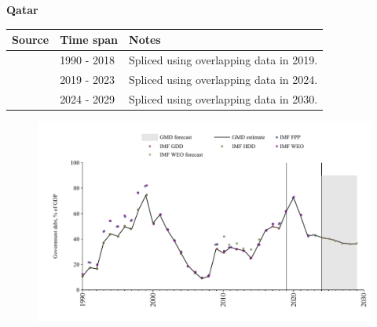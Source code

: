 \documentclass[12pt,a4paper,landscape]{article}
\begin{document}
\begin{adjustbox}{max totalsize={\paperwidth}{\paperheight},center}
\begin{minipage}[t][\textheight][t]{\textwidth}
\vspace*{0.5cm}
{}
\begin{center}
{\Large\bfseries Qatar}
\end{center}
\vspace{0.5cm}
\begin{table}[H]
\centering
\small
\begin{tabular}{|l|l|l|}
\hline
\textbf{Source} & \textbf{Time span} & \textbf{Notes} \\
\hline
\rowcolor{white}\cite{IMF_GDD}& 1990 - 2018 &Spliced using overlapping data in 2019.\\
\rowcolor{lightgray}\cite{IMF_FPP}& 2019 - 2023 &Spliced using overlapping data in 2024.\\
\rowcolor{white}\cite{IMF_WEO_forecast}& 2024 - 2029 &Spliced using overlapping data in 2030.\\
\hline
\end{tabular}
\end{table}
\begin{figure}[H]
\centering
\includegraphics[width=\textwidth,height=0.6\textheight,keepaspectratio]{graphs/QAT_govdebt_GDP.pdf}
\end{figure}
\end{minipage}
\end{adjustbox}
\end{document}
